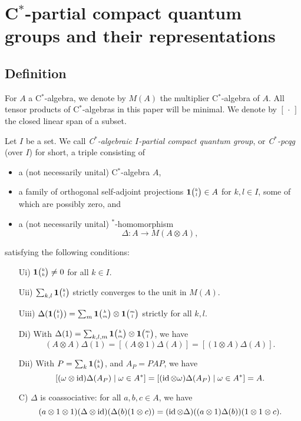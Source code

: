 \section{C$^*$-partial compact quantum groups and their representations}


\subsection{Definition}

For $A$ a C$^*$-algebra, we denote by $M(A)$ the multiplier C$^*$-algebra of $A$. All tensor products of C$^*$-algebras in this paper will be minimal. We denote by $[\,\cdot\,]$ the closed linear span of a subset.

\begin{Def}\label{DefCpcqg} Let $I$ be a set. We call \emph{C$^*$-algebraic $I$-partial compact quantum group}, or \emph{C$^*$-pcqg} (over $I$) for short, a triple consisting of 
\begin{itemize}
\item a (not necessarily unital) C$^*$-algebra $A$,
\item a family of orthogonal self-adjoint projections $\mathbf{1}{\tiny {\begin{pmatrix} k\\l\end{pmatrix}}}\in A$ for $k,l\in I$, some of which are possibly zero, and
\item  a (not necessarily unital) $^*$-homomorphism \[\Delta: A\rightarrow M(A\otimes A),\] 
\end{itemize}
satisfying the following conditions:
\begin{enumerate}[(a)]
\item[Ui)] $\mathbf{1}{\tiny {\begin{pmatrix} k\\k\end{pmatrix}}}\neq 0$ for all $k\in I$. 
\item[Uii)] $\sum_{k,l} \mathbf{1}{\tiny {\begin{pmatrix} k\\l\end{pmatrix}}}$ strictly converges to the unit in $M(A)$.
\item[Uiii)] $\Delta(\mathbf{1}{\tiny {\begin{pmatrix} k\\l\end{pmatrix}}}) = \sum_{m}\mathbf{1}{\tiny {\begin{pmatrix} k\\m\end{pmatrix}}}\otimes \mathbf{1}{\tiny {\begin{pmatrix} m\\l\end{pmatrix}}}$ strictly for all $k,l$. 
\item[Di)] With $\Delta(1) = \sum_{k,l,m} \mathbf{1}{\tiny {\begin{pmatrix} k\\m\end{pmatrix}}}\otimes \mathbf{1}{\tiny {\begin{pmatrix} m\\l\end{pmatrix}}}$, we have \begin{equation}\label{CondDi}(A\otimes A)\Delta(1) = [(A\otimes 1)\Delta(A)] = [(1\otimes A)\Delta(A)].\end{equation} 
\item[Dii)] With $P=\sum_{k} \mathbf{1}{\tiny {\begin{pmatrix} k\\k\end{pmatrix}}}$, and $A_P = PAP$, we have \[[(\omega\otimes \operatorname{id})\Delta(A_P)\mid \omega \in A^*] = [(\operatorname{id}\otimes \omega)\Delta(A_P)\mid \omega \in A^*] = A.\]
\item[C)] $\Delta$ is coassociative: for all $a,b,c\in A$, we have \[(a\otimes 1\otimes 1)(\Delta\otimes \operatorname{id})(\Delta(b)(1\otimes c)) = (\operatorname{id}\otimes \Delta)((a\otimes 1)\Delta(b))(1\otimes 1\otimes c).\] 
\end{enumerate}
\end{Def} 

